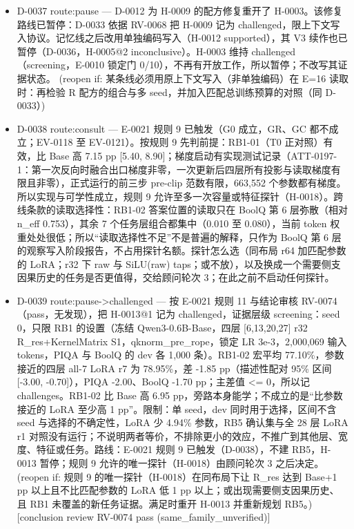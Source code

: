 \documentclass[11pt]{article}
\begin{document}
\begin{itemize}
\item D-0037 route:pause --- D-0012 为 H-0009 的配方修复重开了 H-0003。该修复路线已暂停：D-0033 依据 RV-0068 把 H-0009 记为 challenged，限上下文写入协议。记忆线之后改用单独编码写入（H-0012 supported），其 V3 续作也已暂停（D-0036，H-0005@2 inconclusive）。H-0003 维持 challenged（screening，E-0010 锁定门 0/10），不再有开放工作，所以暂停；不改写其证据状态。 (reopen if: 某条线必须用原上下文写入（非单独编码）在 E=16 读取时：再检验 R 配方的组合与多 seed，并加入匹配总训练预算的对照（同 D-0033）)
\item D-0038 route:consult --- E-0021 规则 9 已触发（G0 成立，GR、GC 都不成立；EV-0118 至 EV-0121）。按规则 9 先判前提：RB1-01（T0 正对照）有效，比 Base 高 7.15 pp [5.40, 8.90]；梯度启动有实现测试记录（ATT-0197-1：第一次反向时融合出口梯度非零，一次更新后四层所有投影与读取梯度有限且非零），正式运行的前三步 pre-clip 范数有限，663,552 个参数都有梯度。所以实现与可学性成立，规则 9 允许至多一次容量或特征探针（H-0018）。跨线条款的读取选择性：RB1-02 答案位置的读取只在 BoolQ 第 6 层弥散（相对 n\_eff 0.753），其余 7 个任务层组合都集中（0.010 至 0.080），当前 token 权重处处很低；所以``读取选择性不足''不是普遍的解释，只作为 BoolQ 第 6 层的观察写入阶段报告，不占用探针名额。探针怎么选（同布局 r64 加匹配参数的 LoRA；r32 下 raw 与 SiLU(raw) taps；或不放），以及换成一个需要侧支因果历史的任务是否更值得，交给顾问轮次 3；在此之前不启动任何探针。
\item D-0039 route:pause-\textgreater{}challenged --- 按 E-0021 规则 11 与结论审核 RV-0074（pass，无发现），把 H-0013@1 记为 challenged，证据层级 screening：seed 0，只限 RB1 的设置（冻结 Qwen3-0.6B-Base，四层 [6,13,20,27] r32 R\_res+KernelMatrix S1，qknorm\_pre\_rope，锁定 LR 3e-3，2,000,069 输入 tokens，PIQA 与 BoolQ 的 dev 各 1,000 条）。RB1-02 宏平均 77.10\%，参数接近的四层 all-7 LoRA r7 为 78.95\%，差 -1.85 pp（描述性配对 95\% 区间 [-3.00, -0.70]），PIQA -2.00、BoolQ -1.70 pp；主差值 \textless{}= 0，所以记 challenges。RB1-02 比 Base 高 6.95 pp，旁路本身能学；不成立的是``比参数接近的 LoRA 至少高 1 pp''。限制：单 seed，dev 同时用于选择，区间不含 seed 与选择的不确定性，LoRA 少 4.94\% 参数，RB5 确认集与全 28 层 LoRA r1 对照没有运行；不说明两者等价，不排除更小的效应，不推广到其他层、宽度、特征或任务。路线：E-0021 规则 9 已触发（D-0038），不建 RB5，H-0013 暂停；规则 9 允许的唯一探针（H-0018）由顾问轮次 3 之后决定。 (reopen if: 规则 9 的唯一探针（H-0018）在同布局下让 R\_res 达到 Base+1 pp 以上且不比匹配参数的 LoRA 低 1 pp 以上；或出现需要侧支因果历史、且 RB1 未覆盖的新任务证据。满足时重开 H-0013 并重新规划 RB5。) [conclusion review RV-0074 pass (same\_family\_unverified)]

\end{itemize}
\end{document}
